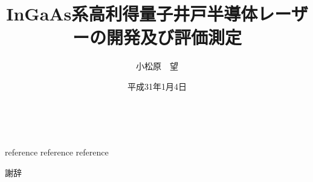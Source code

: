 \documentclass{jreport}
\title{InGaAs系高利得量子井戸半導体レーザーの開発及び評価測定}
\author{小松原　望}
\date{平成31年1月4日}
\begin{document}
\maketitle			%

\tableofcontents 	%
\listoffigures 		%
\listoftables　		%


\begin{thebibliography}{99}
 reference
 reference
 reference
%
\end{thebibliography}



謝辞

\end{document}

